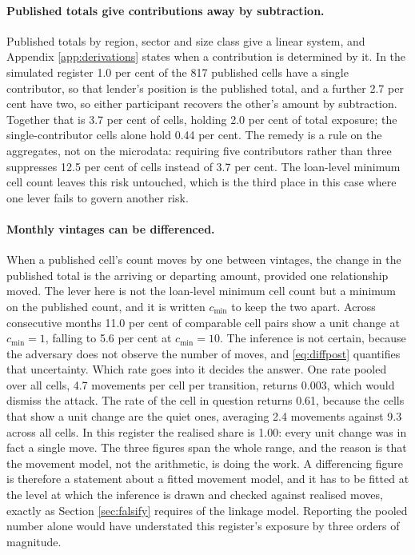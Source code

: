 \documentclass[11pt,a4paper]{article}
\theoremstyle{plain}
\theoremstyle{definition}
\begin{document}
\paragraph{Published totals give contributions away by subtraction.} Published totals by region,
sector and size class give a linear system, and Appendix \ref{app:derivations}
states when a contribution is determined by it. In the simulated register 1.0 per
cent of the 817 published cells have a single contributor, so that lender's
position is the published total, and a further 2.7 per cent have two, so either
participant recovers the other's amount by subtraction. Together that is 3.7 per cent of cells, holding 2.0 per cent of total exposure; the
single-contributor cells alone hold 0.44 per cent. The remedy is a rule on the
aggregates, not on the microdata: requiring five contributors rather than three
suppresses 12.5 per cent of cells instead of 3.7 per cent. The loan-level minimum cell count leaves this risk untouched, which is the third
place in this case where one lever fails to govern another risk.

\paragraph{Monthly vintages can be differenced.} When a published cell's count
moves by one between vintages, the change in the published total is the arriving
or departing amount, provided one relationship moved. The lever here is not the loan-level minimum cell count but a minimum on the
published count, and it is written $c_{\min}$ to keep the two apart. Across
consecutive months 11.0 per cent of comparable cell pairs show a unit change at
$c_{\min} = 1$, falling to 5.6 per cent at $c_{\min} = 10$. The inference is not certain, because the adversary does not observe the number of
moves, and \eqref{eq:diffpost} quantifies that uncertainty. Which rate goes into it
decides the answer. One rate pooled over all cells, 4.7 movements per cell per
transition, returns 0.003, which would dismiss the attack. The rate of the cell in
question returns 0.61, because the cells that show a unit change are the quiet
ones, averaging 2.4 movements against 9.3 across all cells. In this register the
realised share is 1.00: every unit change was in fact a single move. The three
figures span the whole range, and the reason is that the movement model, not the
arithmetic, is doing the work. A differencing figure is therefore a statement about
a fitted movement model, and it has to be fitted at the level at which the
inference is drawn and checked against realised moves, exactly as Section
\ref{sec:falsify} requires of the linkage model. Reporting the pooled number alone
would have understated this register's exposure by three orders of magnitude.
\end{document}
